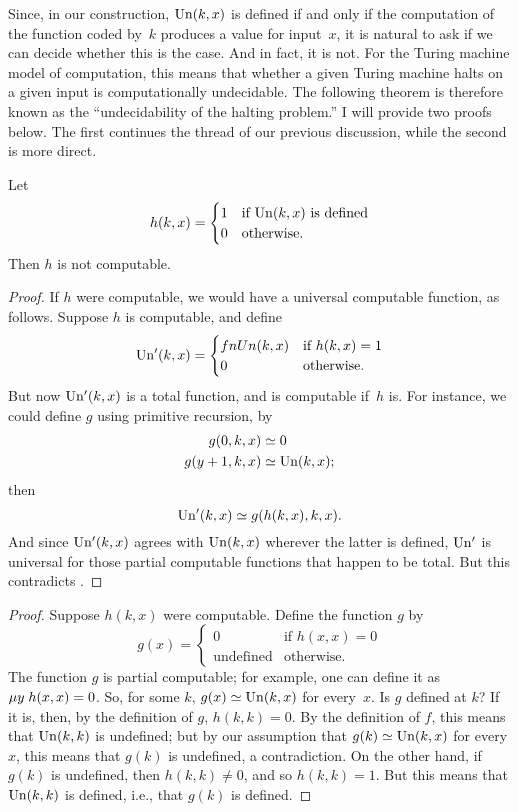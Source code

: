 \documentclass[../../include/open-logic-section]{subfiles}
\begin{document}

Since, in our construction, $\mathrm{Un}(k,x)$ is defined if and only if
the computation of the function coded by~$k$ produces a value for
input~$x$, it is natural to ask if we can decide whether this is the
case. And in fact, it is not. For the Turing machine model of
computation, this means that whether a given Turing
machine halts on a given input is computationally undecidable. The
following theorem is therefore known as the ``undecidability of the
halting problem.'' I will provide two proofs below. The first
continues the thread of our previous discussion, while the second is
more direct.

\begin{thm}
Let
\[
h(k, x)  =
\begin{cases}
1 & \text{if $\fn{Un}(k,x)$ is defined} \\
0 & \text{otherwise.}
\end{cases}
\]
Then $h$ is not computable.
\end{thm}

\begin{proof}
If $h$ were computable, we would have a universal computable function,
as follows. Suppose $h$ is computable, and define
\[
\fn{Un'}(k,x) =
\begin{cases}
fn{Un}(k,x) & \text{if $h(k,x) = 1$} \\
0 & \text{otherwise.}
\end{cases}
\]
But now $\mathrm{Un'}(k, x)$ is a total function, and is computable if~$h$
is.  For instance, we could define $g$ using primitive recursion, by
\begin{align*}
g(0, k, x) & \simeq 0 \\
g(y+1, k, x) & \simeq \fn{Un}(k,x);
\end{align*}
then
\[
\mathrm{Un'}(k,x) \simeq g(h(k,x),k,x).
\]
And since $\mathrm{Un'}(k,x)$ agrees with $\mathrm{Un}(k,x)$ wherever the
latter is defined, $\mathrm{Un'}$ is universal for those partial
computable functions that happen to be total.  But this contradicts
.
\end{proof}

\begin{proof}
Suppose $h(k,x)$ were computable. Define the function $g$ by
\[
g(x) =
\begin{cases}
  0                & \text{if $h(x,x) = 0$} \\
  \text{undefined} & \text{otherwise.}
\end{cases}
\]
The function $g$ is partial computable; for example, one can define it
as $\mu y \; h(x,x) = 0$. So, for some $k$, $g(x) \simeq \mathrm{Un}(k, x)$ for
every~$x$. Is $g$ defined at $k$?  If it is, then, by the definition
of $g$, $h(k,k) = 0$. By the definition of $f$, this means that
$\mathrm{Un}(k, k)$ is undefined; but by our assumption that $g(k) \simeq
\mathrm{Un}(k, x)$ for every $x$, this means that $g(k)$ is undefined, a
contradiction. On the other hand, if $g(k)$ is undefined, then $h(k,k)
\neq 0$, and so $h(k,k) = 1$. But this means that $\mathrm{Un}(k, k)$ is
defined, i.e., that $g(k)$ is defined.
\end{proof}
\end{document}
